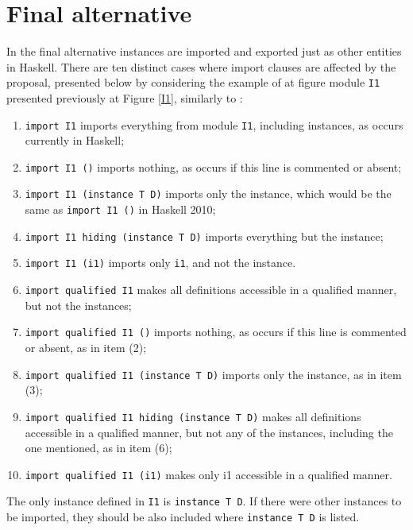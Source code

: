 \documentclass[msc]{ppgccufmg}
\begin{document}
\section{Final alternative}
\label{final}
In the final alternative instances are imported and exported just as other entities in Haskell.  There are ten distinct
cases where import clauses are affected by the proposal, presented below by
considering the example of at figure  module
\texttt{I1} presented previously at Figure \ref{I1}, similarly to
\cite[section~5.3.4]{report}:
\begin{enumerate}
\item \texttt{import I1} imports everything from module \texttt{I1},
  including instances, as occurs currently in Haskell;
\item \texttt{import I1 ()} imports nothing, as occurs if this line
  is commented or absent;
\item \texttt{import I1 (instance T D)} imports only the instance, which
  would be the same as \texttt{import I1 ()} in Haskell 2010;
\item \texttt{import I1 hiding (instance T D)} imports everything but
  the instance;
\item \texttt{import I1 (i1)} imports only \texttt{i1}, and not the
  instance.
\item \texttt{import qualified I1} makes all definitions accessible in a
  qualified manner, but not the instances;
\item \texttt{import qualified I1 ()} imports nothing, as occurs if this line is
  commented or absent, as in item (2);
\item \texttt{import qualified I1 (instance T D)} imports only the instance,
  as in item (3);
\item \texttt{import qualified I1 hiding (instance T D)} makes all definitions
  accessible in a qualified manner, but not any of the instances, including the
  one mentioned, as in item (6);
\item \texttt{import qualified I1 (i1)} makes only i1 accessible in a qualified
  manner.
\end{enumerate}

The only instance defined in \texttt{I1} is
\texttt{instance T D}.  If there were other instances to be imported, they should be also included
where \texttt{instance T D} is listed.
\end{document}
